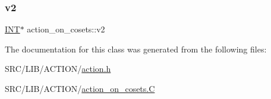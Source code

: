 \subsubsection{\texorpdfstring{v2}{v2}}
{\footnotesize\ttfamily \mbox{\hyperlink{galois_8h_a09fddde158a3a20bd2dcadb609de11dc}{I\+NT}}$\ast$ action\+\_\+on\+\_\+cosets\+::v2}



The documentation for this class was generated from the following files\+:\begin{DoxyCompactItemize}
\item 
S\+R\+C/\+L\+I\+B/\+A\+C\+T\+I\+O\+N/\mbox{\hyperlink{action_8h}{action.\+h}}\item 
S\+R\+C/\+L\+I\+B/\+A\+C\+T\+I\+O\+N/\mbox{\hyperlink{action__on__cosets_8_c}{action\+\_\+on\+\_\+cosets.\+C}}\end{DoxyCompactItemize}
